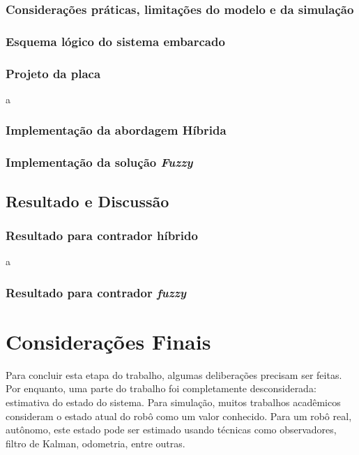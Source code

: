	\subsection{Considerações práticas, limitações do modelo e da simulação}

	\subsection{Esquema lógico do sistema embarcado}

	\subsection{Projeto da placa}
	
	a
	
	\subsection{Implementação da abordagem Híbrida}

	\subsection{Implementação da solução \textit{Fuzzy}}
	
\section{Resultado e Discussão}

	\subsection{Resultado para contrador híbrido}

	a
	
	\subsection{Resultado para contrador \textit{fuzzy}}

\chapter{Considerações Finais}
\vspace{-2.5 cm}

Para concluir esta etapa do trabalho, algumas deliberações precisam ser feitas.
Por enquanto, uma parte do trabalho foi completamente desconsiderada: estimativa
do estado do sistema. Para simulação, muitos trabalhos acadêmicos consideram o
estado atual do robô como um valor conhecido. Para um robô real, autônomo, este
estado pode ser estimado usando técnicas como observadores, filtro de Kalman,
odometria, entre outras.

